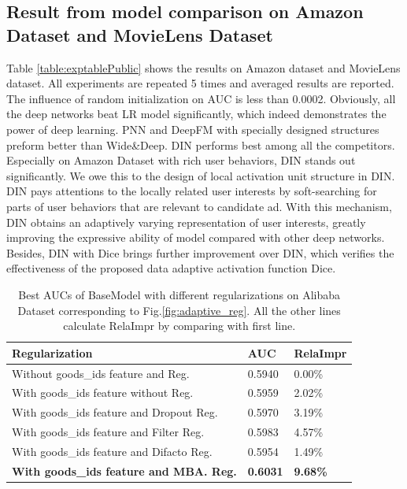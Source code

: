 \subsection{Result from model comparison on Amazon Dataset and MovieLens Dataset}
Table \ref{table:exptablePublic} shows the results on Amazon dataset and MovieLens dataset.
All experiments are repeated 5 times and averaged results are reported. The influence of random initialization on AUC is less than 0.0002.
Obviously, all the deep networks beat LR model significantly, which indeed demonstrates the power of deep learning.   
PNN and DeepFM with specially designed structures preform better than Wide\&Deep. 
DIN performs best among all the competitors. 
Especially on Amazon Dataset with rich user behaviors, DIN stands out significantly.
We owe this to the design of local activation unit structure in DIN.
DIN pays attentions to the locally related user interests by soft-searching for parts of user behaviors that are relevant to candidate ad. With this mechanism, DIN obtains an adaptively varying representation of user interests, greatly improving the expressive ability of model compared with other deep networks.  
Besides, DIN with Dice brings further improvement over DIN, which verifies the effectiveness of the proposed data adaptive activation function Dice.  




\begin{table}[]
\caption{Best AUCs of BaseModel with different regularizations on Alibaba Dataset corresponding to Fig.\ref{fig:adaptive_reg}. All the other lines calculate RelaImpr by comparing with first line.}
\small
\centering
\begin{threeparttable}
\begin{tabular}{p{5cm} p{0.6cm}<{\centering} p{0.8cm}<{\centering}}
\toprule
 Regularization    & AUC  &RelaImpr \\ \midrule
Without goods\_ids feature and Reg. & 0.5940 & 0.00\% \\
With goods\_ids feature without Reg. & 0.5959  & 2.02\% \\
With goods\_ids feature and Dropout Reg. & 0.5970  & 3.19\%  \\
With goods\_ids feature and Filter Reg.  & 0.5983& 4.57\%  \\
With goods\_ids feature and Difacto Reg.  & 0.5954 & 1.49\%  \\
\textbf{With goods\_ids feature and MBA. Reg.}  & \textbf{0.6031}  & \textbf{9.68\%}  \\ \bottomrule
\end{tabular}
\end{threeparttable}
\label{table:expreg}
\end{table}



